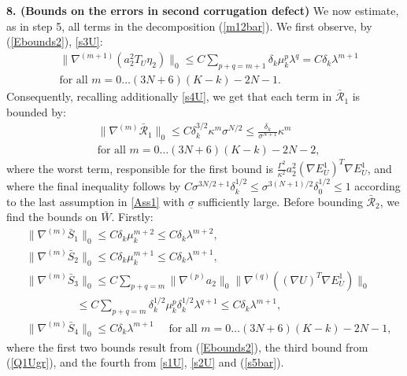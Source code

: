 \documentclass[reqno,twoside,11pt]{amsart}
\numberwithin{equation}{section}
\theoremstyle{plain}
\theoremstyle{definition}
\begin{document}
{\bf 8. (Bounds on the errors in second corrugation defect)}
We now estimate, as in step 5, all terms in the decomposition (\ref{m12bar}).
We first observe, by (\ref{Ebounds2}), \ref{s3U}:
\begin{equation}\label{s5bar}
\begin{split}
& \|\nabla^{(m+1)}(a_2^2T_{U}\eta_2)\|_0\leq
C\sum_{p+q=m+1}\delta_k\mu_k^p\lambda^q=C\delta_k\lambda^{m+1} 
\\ & \mbox{for all } m=0\ldots (3N+6)(K-k)-2N-1.
\end{split}
\end{equation}
Consequently, recalling additionally
\ref{s4U}, we get that each term in $\bar{\mathcal{R}}_1$ is bounded by:
\begin{equation}\label{m13bar}
\begin{split}
& \|\nabla^{(m)}\bar{\mathcal{R}}_1\|_0\leq C\delta_k^{3/2}\kappa^m\sigma^{N/2}\leq
\frac{\delta_k}{\sigma^{N+1}}\kappa^m
\\ & \mbox{for all } m=0\ldots (3N+6)(K-k)-2N-2,
\end{split}
\end{equation}
where the worst term, responsible for the first bound is
$\frac{\Gamma^2}{\kappa^2}a_2^2(\nabla E^1_{U})^T \nabla
E^1_{U}$, and where the final inequality follows by
$C\sigma^{3N/2+1}\delta_k^{1/2}\leq \sigma^{3(N+1)/2}\delta_0^{1/2} \leq 1$ 
according to the last assumption in \ref{Ass1} with
$\underline\sigma$ sufficiently large.
Before bounding $\bar{\mathcal{R}}_2$, we find the bounds on
$\bar W$. Firstly:
\begin{equation}\label{SUboundbar}
\begin{split}
& \|\nabla^{(m)}\bar S_1\|_0\leq C\delta_k\mu_k^{m+2} \leq C\delta_k\lambda^{m+2}, \\
& \|\nabla^{(m)}\bar S_2\|_0\leq C\delta_k\mu_k^{m+1} \leq C\delta_k\lambda^{m+1}, \\
& \|\nabla^{(m)}\bar S_3\|_0\leq
C\sum_{p+q=m}\|\nabla^{(p)}a_2\|_0\|\nabla^{(q)}((\nabla U)^T\nabla
E_{U}^1)\|_0\\ & \qquad \qquad\;\; \leq
C\sum_{p+q=m}\delta_k^{1/2}\mu_k^p\delta_k^{1/2}\lambda^{q+1}
\leq C\delta_k\lambda^{m+1}, \\
& \|\nabla^{(m)}\bar S_4\|_0\leq C\delta_k\lambda^{m+1} \quad\mbox{ for all } 
m=0\ldots (3N+6)(K-k)-2N-1,
\end{split}
\end{equation}
where the first two bounds result from (\ref{Ebounds2}), the third bound
from (\ref{Q1Ugr}), and the fourth from \ref{s1U}, \ref{s2U} and (\ref{s5bar}). 
\end{document}
